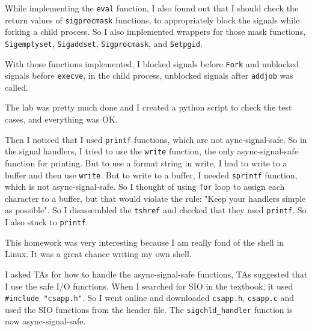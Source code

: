 \documentclass[12pt]{report}
\begin{document}
While implementing the \texttt{eval} function, I also found out that I should check the return values of \texttt{sigprocmask} functions, to appropriately block the signals while forking a child process. So I also implemented wrappers for those mask functions, \texttt{Sigemptyset}, \texttt{Sigaddset}, \texttt{Sigprocmask}, and \texttt{Setpgid}.

With those functions implemented, I blocked signals before \texttt{Fork} and unblocked signals before \texttt{execve}, in the child process, unblocked signals after \texttt{addjob} was called.

The lab was pretty much done and I created a python script to check the test cases, and everything was OK.

Then I noticed that I used \texttt{printf} functions, which are not aync-signal-safe. So in the signal handlers, I tried to use the \texttt{write} function, the only async-signal-safe function for printing. But to use a format string in write, I had to write to a buffer and then use \texttt{write}. But to write to a buffer, I needed \texttt{sprintf} function, which is not async-signal-safe. So I thought of using \texttt{for} loop to assign each character to a buffer, but that would violate the rule: "Keep your handlers simple as possible". So I disassembled the \texttt{tshref} and checked that they used \texttt{printf}. So I also stuck to \texttt{printf}.

This homework was very interesting because I am really fond of the shell in Linux. It was a great chance writing my own shell.

I asked TAs for how to handle the async-signal-safe functions, TAs suggested that I use the safe I/O functions. When I searched for SIO in the textbook, it used \texttt{\#include "csapp.h"}. So I went online and downloaded \texttt{csapp.h}, \texttt{csapp.c} and used the SIO functions from the header file. The \texttt{sigchld\_handler} function is now async-signal-safe.
\end{document}

